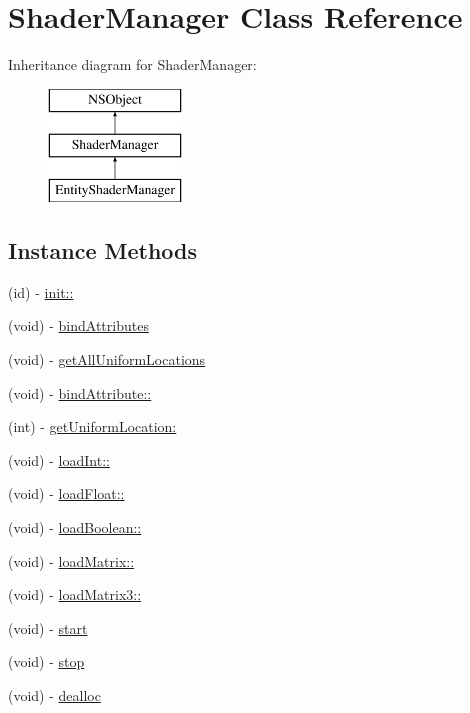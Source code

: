 \hypertarget{interface_shader_manager}{}\section{Shader\+Manager Class Reference}
\label{interface_shader_manager}
Inheritance diagram for Shader\+Manager\+:\begin{figure}[H]
\begin{center}
\leavevmode
\includegraphics[height=3.000000cm]{interface_shader_manager}
\end{center}
\end{figure}
\subsection*{Instance Methods}
\begin{DoxyCompactItemize}
\item 
(id) -\/ \hyperlink{interface_shader_manager_a5b7d6903d3e8dcf4875cb144046e3262}{init\+::}
\item 
(void) -\/ \hyperlink{interface_shader_manager_ad7c264b0d06bccf7c1e19976633173d0}{bind\+Attributes}
\item 
(void) -\/ \hyperlink{interface_shader_manager_abe1fcce536c9bd78cd14a23e2b2ac46b}{get\+All\+Uniform\+Locations}
\item 
(void) -\/ \hyperlink{interface_shader_manager_a9fb731a8cd811cf1740c13cb52774f18}{bind\+Attribute\+::}
\item 
(int) -\/ \hyperlink{interface_shader_manager_a0923a8bdd737a702639f26549c2d5186}{get\+Uniform\+Location\+:}
\item 
(void) -\/ \hyperlink{interface_shader_manager_aad63531f25750d7cb657dcb10670a5c5}{load\+Int\+::}
\item 
(void) -\/ \hyperlink{interface_shader_manager_a613176179acff066ba03a1409b93dcf3}{load\+Float\+::}
\item 
(void) -\/ \hyperlink{interface_shader_manager_accbae5024b71677f3e9fef5c8b6cd0fa}{load\+Boolean\+::}
\item 
(void) -\/ \hyperlink{interface_shader_manager_a23706b17b23084ce2e83055857631905}{load\+Matrix\+::}
\item 
(void) -\/ \hyperlink{interface_shader_manager_a7dc69f2cb034c904c1483e7764cdb71b}{load\+Matrix3\+::}
\item 
(void) -\/ \hyperlink{interface_shader_manager_a5169f1f4fac9bf471bb328275d5eb6e5}{start}
\item 
(void) -\/ \hyperlink{interface_shader_manager_ade2ef03222793482549cc5f49f5f0fd3}{stop}
\item 
(void) -\/ \hyperlink{interface_shader_manager_ad0519a6e937387a7a3377123d2eac386}{dealloc}
\end{DoxyCompactItemize}


